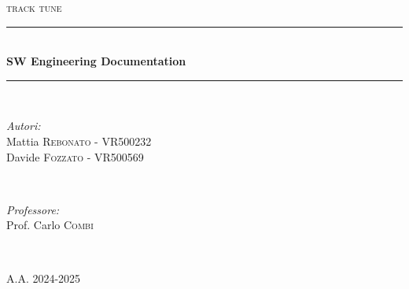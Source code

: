 \begin{titlepage}
    $ $
    \vspace{5pt}
    \newcommand{\HRule}{\rule{\linewidth}{0.5mm}}
    \begin{center}
    \textsc{\normalsize track tune}\\[1cm]
    \end{center}
    
    \center
     
    
    \HRule \\[0.4cm]
    { \huge \bfseries SW Engineering Documentation}\\[0.4cm] %
    \HRule \\[1.5cm]
     
    
    \begin{minipage}{0.4\textwidth}
    \begin{flushleft} \large
    \emph{Autori:}\\
    Mattia \textsc{Rebonato} - VR500232\\
    Davide \textsc{Fozzato} - VR500569\\
    \end{flushleft}
    \end{minipage}
    ~
    \begin{minipage}{0.4\textwidth}
    \begin{flushright} \large
    \emph{Professore:} \\
    Prof. Carlo \textsc{Combi}
    \end{flushright}
    \end{minipage}\\[2cm]
    
    \vspace{250pt}
    
    \textsc{\normalsize A.A. 2024-2025}\\[0.5cm]
    
    \vfill %
    \end{titlepage}